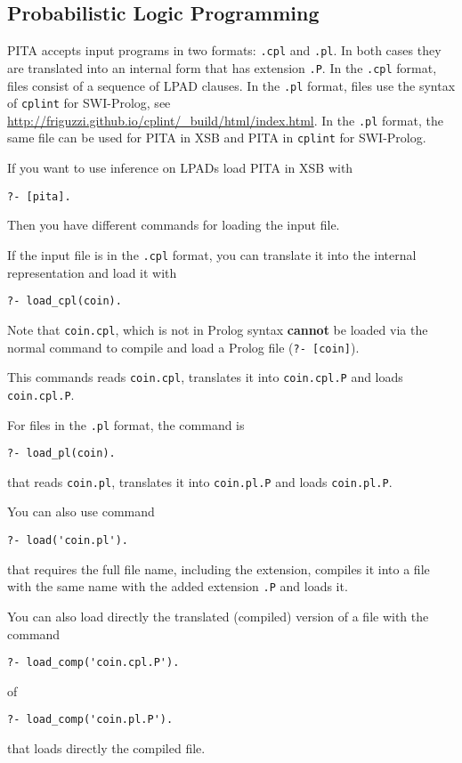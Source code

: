 \subsection{Probabilistic Logic Programming}
PITA accepts input programs in two formats: \texttt{.cpl} and \texttt{.pl}.
In both cases they are translated into an internal form that has extension \texttt{.P}.
In the \texttt{.cpl} format, files consist of a sequence of LPAD clauses.
In the \texttt{.pl} format, files use the syntax of \texttt{cplint} for SWI-Prolog, see
\url{http://friguzzi.github.io/cplint/_build/html/index.html}. In the  \texttt{.pl}
format, the same file can be used for PITA in XSB and PITA in \texttt{cplint} for SWI-Prolog.

If you want to use inference on LPADs load PITA in XSB with
\begin{verbatim}
?- [pita].
\end{verbatim}

Then you have different commands for loading the input file.

If the input file is in the \texttt{.cpl} format, you can translate it into the internal
representation and load it with
\begin{verbatim}
?- load_cpl(coin).
\end{verbatim}
Note that {\tt coin.cpl}, which is not in Prolog syntax {\bf cannot}
be loaded via the normal command to compile and load a Prolog file
({\tt ?- [coin]}).

This commands reads  {\tt coin.cpl}, translates it into  {\tt coin.cpl.P}
and loads   {\tt coin.cpl.P}.

For files in the  \texttt{.pl} format, the command is
\begin{verbatim}
?- load_pl(coin).
\end{verbatim}
that  reads  {\tt coin.pl}, translates it into  {\tt coin.pl.P}
and loads   {\tt coin.pl.P}.

You can also use command
\begin{verbatim}
?- load('coin.pl').
\end{verbatim}
that requires the full file name, including the extension, compiles it into a file with the same name with the added extension
\texttt{.P} and loads it.

You can also load directly the translated (compiled) version of a file with the command
\begin{verbatim}
?- load_comp('coin.cpl.P').
\end{verbatim}
of
\begin{verbatim}
?- load_comp('coin.pl.P').
\end{verbatim}
that loads directly the compiled file.

